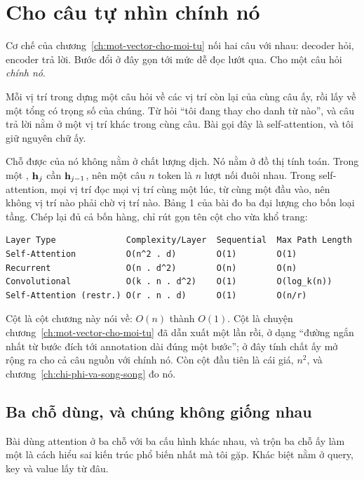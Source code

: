 \section{Cho câu tự nhìn chính nó}
\label{sec:ch07-tu-nhin}

%
Cơ chế của chương~\ref{ch:mot-vector-cho-moi-tu} nối hai câu với nhau: decoder
hỏi, encoder trả lời. Bước đổi ở đây gọn tới mức dễ đọc lướt qua. Cho một câu
hỏi \emph{chính nó}.

Mỗi vị trí trong  dựng một câu hỏi về các vị trí
còn lại của cùng câu
ấy, rồi lấy về một tổng có trọng số của chúng. Từ  hỏi \enquote{tôi
đang thay cho danh từ nào}, và câu trả lời nằm ở một vị trí khác trong cùng
câu. Bài gọi đây là self-attention, và tôi giữ nguyên chữ ấy.

Chỗ được của nó không nằm ở chất lượng dịch. Nó nằm ở đồ thị tính toán. Trong
một , \(\mathbf{h}_j\) cần
\(\mathbf{h}_{j-1}\), nên một câu \(n\) token
là \(n\) lượt nối đuôi nhau. Trong self-attention, mọi vị trí đọc mọi vị trí
cùng một lúc, từ cùng một đầu vào, nên không vị trí nào phải chờ vị trí nào.
Bảng 1 của bài đo ba đại lượng cho bốn loại tầng. Chép lại đủ cả bốn hàng, chỉ
rút gọn tên cột cho vừa khổ trang:

\begin{verbatim}
Layer Type              Complexity/Layer  Sequential  Max Path Length
Self-Attention          O(n^2 . d)        O(1)        O(1)
Recurrent               O(n . d^2)        O(n)        O(n)
Convolutional           O(k . n . d^2)    O(1)        O(log_k(n))
Self-Attention (restr.) O(r . n . d)      O(1)        O(n/r)
\end{verbatim}

Cột  là cột chương này nói về: \(O(n)\) thành \(O(1)\). Cột
 là chuyện chương~\ref{ch:mot-vector-cho-moi-tu} đã dẫn
xuất một lần rồi, ở dạng \enquote{đường ngắn nhất từ bước đích tới annotation
dài đúng một bước}; ở đây tính chất ấy mở rộng ra cho cả câu nguồn với chính nó.
Còn cột đầu tiên là cái giá, \(n^2\), và chương~\ref{ch:chi-phi-va-song-song}
đo nó.

\subsection*{Ba chỗ dùng, và chúng không giống nhau}

%
Bài dùng attention ở ba chỗ với ba cấu hình khác nhau, và trộn ba chỗ ấy làm
một là cách hiểu sai kiến trúc phổ biến nhất mà tôi gặp. Khác biệt nằm ở query,
key và value lấy từ đâu.

